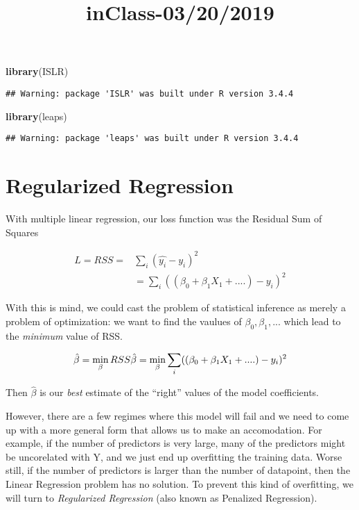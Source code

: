 \documentclass[]{article}
\title{inClass-03/20/2019}
\author{}
\date{}
\newenvironment{Shaded}{\begin{snugshade}}{\end{snugshade}}
\newcommand{\KeywordTok}[1]{\textcolor[rgb]{0.13,0.29,0.53}{\textbf{{#1}}}}
\newcommand{\NormalTok}[1]{{#1}}
\begin{document}
\maketitle

\begin{Shaded}
\begin{Highlighting}[]
\KeywordTok{library}\NormalTok{(ISLR)}
\end{Highlighting}
\end{Shaded}

\begin{verbatim}
## Warning: package 'ISLR' was built under R version 3.4.4
\end{verbatim}

\begin{Shaded}
\begin{Highlighting}[]
\KeywordTok{library}\NormalTok{(leaps)}
\end{Highlighting}
\end{Shaded}

\begin{verbatim}
## Warning: package 'leaps' was built under R version 3.4.4
\end{verbatim}

\section{Regularized Regression}\label{regularized-regression}

With multiple linear regression, our loss function was the Residual Sum
of Squares

\[
\begin{align}
L = RSS =& \sum_i (\hat{y_i} - y_i)^2 \\
&= \sum_i (\left( \beta_0 + \beta_1 X_1 + .... \right) - y_i)^2
\end{align}
\]

With this is mind, we could cast the problem of statistical inference as
merely a problem of optimization: we want to find the vaulues of
\(\beta_0, \beta_1,...\) which lead to the \emph{minimum} value of RSS.

\[
\hat{\beta} = \min_{\beta} RSS \\ 
\hat{\beta} = \min_{\beta} \sum_i (\left( \beta_0 + \beta_1 X_1 + .... \right) - y_i)^2
\]

Then \(\hat{\beta}\) is our \emph{best} estimate of the ``right'' values
of the model coefficients.

However, there are a few regimes where this model will fail and we need
to come up with a more general form that allows us to make an
accomodation. For example, if the number of predictors is very large,
many of the predictors might be uncorelated with Y, and we just end up
overfitting the training data. Worse still, if the number of predictors
is larger than the number of datapoint, then the Linear Regression
problem has no solution. To prevent this kind of overfitting, we will
turn to \emph{Regularized Regression} (also known as Penalized
Regression).
\end{document}
